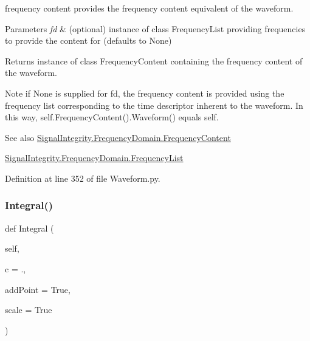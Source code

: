 frequency content provides the frequency content equivalent of the waveform. 


\begin{DoxyParams}{Parameters}
{\em fd} & (optional) instance of class Frequency\+List providing frequencies to provide the content for (defaults to None) \\
\hline
\end{DoxyParams}
\begin{DoxyReturn}{Returns}
instance of class Frequency\+Content containing the frequency content of the waveform. 
\end{DoxyReturn}
\begin{DoxyNote}{Note}
if None is supplied for fd, the frequency content is provided using the frequency list corresponding to the time descriptor inherent to the waveform. In this way, self.\+Frequency\+Content().Waveform() equals self. 
\end{DoxyNote}
\begin{DoxySeeAlso}{See also}
\hyperlink{namespaceSignalIntegrity_1_1FrequencyDomain_1_1FrequencyContent}{Signal\+Integrity.\+Frequency\+Domain.\+Frequency\+Content} 

\hyperlink{namespaceSignalIntegrity_1_1FrequencyDomain_1_1FrequencyList}{Signal\+Integrity.\+Frequency\+Domain.\+Frequency\+List} 
\end{DoxySeeAlso}


Definition at line 352 of file Waveform.\+py.

\mbox{\label{classSignalIntegrity_1_1TimeDomain_1_1Waveform_1_1Waveform_1_1Waveform_a47667b6657a67800a3a94d6cc492bdaa}} 
\subsubsection{\texorpdfstring{Integral()}{Integral()}}
{\footnotesize\ttfamily def Integral (\begin{DoxyParamCaption}\item[{}]{self,  }\item[{}]{c = {.},  }\item[{}]{add\+Point = {\ttfamily True},  }\item[{}]{scale = {\ttfamily True} }\end{DoxyParamCaption})}




